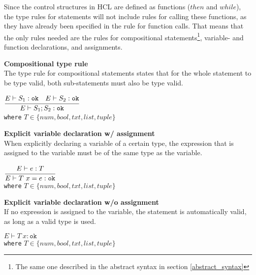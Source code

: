 Since the control structures in HCL are defined as functions ($then$ and $while$), the type rules for statements will not include rules for calling these functions, as they have already been specified in the rule for function calls.
That means that the only rules needed are the rules for compositional statements\footnote{The same one described in the abstract syntax in section \ref{abstract_syntax}}, variable- and function declarations, and assignments.

\textbf{Compositional type rule}\\
The type rule for compositional statements states that for the whole statement to be type valid, both sub-statements must also be type valid.

\begin{center}
	\begin{math}
	\cfrac
	{E \vdash S_1 : \texttt{ok}\quad E \vdash S_2 : \texttt{ok}}
	{E \vdash S_1;S_2 : \texttt{ok}}
	\end{math}
	\\[1\baselineskip]
	\texttt{where} $T \in \{num, bool, txt, list, tuple\}$
\end{center}


\textbf{Explicit variable declaration w/ assignment}\\
When explicitly declaring a variable of a certain type, the expression that is assigned to the variable must be of the same type as the variable.

\begin{center}
	\begin{math}
		\cfrac
		{E \vdash e : T}
		{E \vdash T\ x = e : \texttt{ok}}
	\end{math}
	\\[1\baselineskip]
	\texttt{where} $T \in \{num, bool, txt, list, tuple\}$
\end{center}

\textbf{Explicit variable declaration w/o assignment}\\
If no expression is assigned to the variable, the statement is automatically valid, as long as a valid type is used.

\begin{center}
	\begin{math}
		E \vdash T\ x : \texttt{ok}
	\end{math}
	\\[1\baselineskip]
	\texttt{where} $T \in \{num, bool, txt, list, tuple\}$
\end{center}

